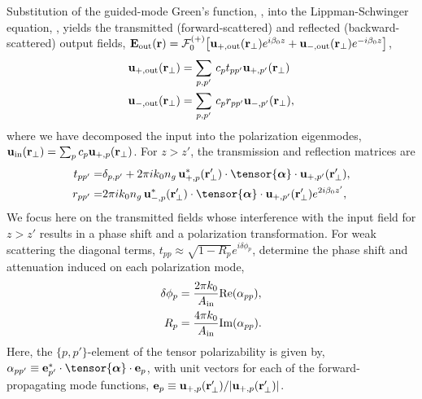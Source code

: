 \documentclass[aps,pra,twocolumn]{revtex4-1} %
\newcommand{\out}{{\rm out}}
\newcommand{\fwd}{+}
\newcommand{\bwd}{-}
\newcommand{\trans}{+}
\newcommand{\refl}{-}
\newcommand{\Eamp}{\mathcal{F}_0^{(+)}}
\begin{document}
Substitution of the guided-mode Green's function, , into the Lippman-Schwinger equation, , yields the transmitted (forward-scattered) and reflected (backward-scattered) output fields, $\mathbf{E}_{\out}(\br) = \Eamp \big[ \mathbf{u}_{\trans, \out} (\br_\perp) e^{i \beta_0 z} + \mathbf{u}_{\refl,\out} (\br_\perp) e^{-i \beta_0 z} \big]$, 
\begin{subequations}
	\begin{align}
		\mathbf{u}_{\trans, \out} (\br_\perp) &=  \sum_{p,p'}  \, c_{p} t_{pp'} \mathbf{u}_{\fwd, p'}(\br_\perp) \\ 
		\mathbf{u}_{\refl,\out} (\br_\perp) &=  \sum_{p,p'}  \, c_{p} r_{pp'} \mathbf{u}_{\bwd, p'}(\br_\perp),
	\end{align}
\end{subequations}
where we have decomposed the input into the polarization eigenmodes, $\mbf{u}_{\rm in}(\mbf{r}_\perp) = \sum_{p} c_{p} \mathbf{u}_{\fwd,p}(\br_\perp)$.  
For $z>z'$, the transmission and reflection matrices are 
\begin{subequations}
	\begin{align} \label{Eq::PolarizationTransformation}
		t_{pp'} =& \delta_{p,p'} +  2\pi i k_0 n_g \, \mathbf{u}^*_{+, p}(\br'_\perp) \cdot 
\tensor{\boldsymbol{\alpha}} \cdot \mathbf{u}_{+, p'}(\br'_\perp) , \\
		r_{pp'} =&  2\pi i k_0 n_g \, \mathbf{u}^*_{\bwd, p}(\br'_\perp) \cdot 
\tensor{\boldsymbol{\alpha}} \cdot \mathbf{u}_{\fwd, p'}(\br'_\perp) e^{2 i\beta_0 z'} , 
	\end{align} 
\end{subequations}
We focus here on the transmitted fields whose interference with the input field for $z>z'$ results in a phase shift and a polarization transformation.  
For weak scattering the diagonal terms, $t_{p p} \approx \sqrt{1-R_p}e^{i \delta \phi_p}$, determine the phase shift and attenuation induced on each polarization mode,
\begin{subequations}
	\begin{align}
		 \delta \phi_p &= \frac{2 \pi k_0}{A_{\rm in}} {\rm Re}(\alpha_{pp}),  \label{Eq::PhaseShift} \\
		R_p &=  \frac{4 \pi k_0}{A_{\rm in}} {\rm Im}(\alpha_{pp}) .\label{Eq::Attenuation} 
	\end{align} 
\end{subequations}
Here, the $\{p,p'\}$-element of the tensor polarizability is given by, $\alpha_{pp'} \equiv \mathbf{e}^*_{p'} \cdot \tensor{\boldsymbol{\alpha}}\cdot \mathbf{e}_{p}$, with unit vectors for each of the forward-propagating mode functions, $\mathbf{e}_{p}\equiv \mathbf{u}_{+,p}(\mathbf{r}'_\perp)/|\mathbf{u}_{+,p}(\mathbf{r}'_\perp)|$. 
\end{document}
